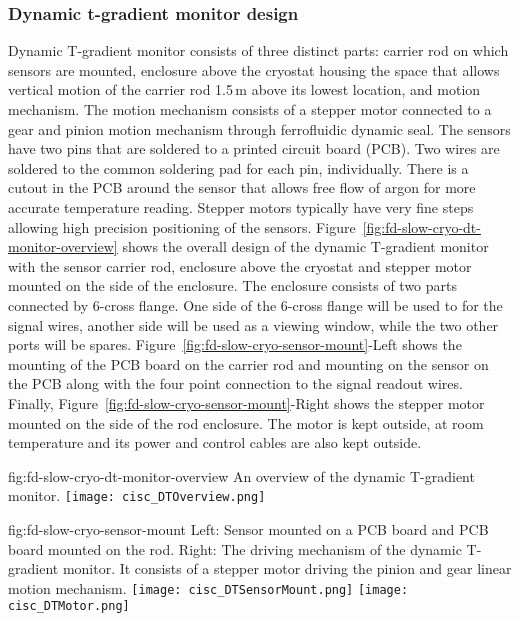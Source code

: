 \subsubsection{Dynamic t-gradient monitor design}
Dynamic T-gradient monitor consists of three distinct parts: carrier rod on which sensors are mounted, enclosure above the cryostat housing the space that allows vertical motion of the carrier rod 1.5\,m above its lowest location, and motion mechanism. The motion mechanism consists of a stepper motor connected to a gear and pinion motion mechanism through ferrofluidic dynamic seal. The sensors have two pins that are soldered to a printed circuit board (PCB). Two wires are soldered to the common soldering pad for each pin, individually.   There is a cutout in the PCB around the sensor that allows free flow of argon for more accurate temperature reading.  Stepper motors typically have very fine steps allowing high precision positioning of the sensors.  Figure~\ref{fig:fd-slow-cryo-dt-monitor-overview} shows the overall design of the dynamic T-gradient monitor with the sensor carrier rod, enclosure above the cryostat and stepper motor mounted on the side of the enclosure. The enclosure consists of two parts connected by 6-cross flange. One side of the 6-cross flange will be used to for the signal wires, another side will be used as a viewing window, while the two other ports will be spares. Figure~\ref{fig:fd-slow-cryo-sensor-mount}-Left shows the mounting of the PCB board on the carrier rod and mounting on the sensor on the PCB along with the four point connection to the signal readout wires. Finally, Figure~\ref{fig:fd-slow-cryo-sensor-mount}-Right shows the stepper motor mounted on the side of the rod enclosure. The motor is kept outside, at room temperature and its power and control cables are also kept outside.

\begin{dunefigure}{fig:fd-slow-cryo-dt-monitor-overview}
  {An overview of the dynamic T-gradient monitor.}
 \texttt{[image: cisc\_DTOverview.png]}
\end{dunefigure}
\begin{dunefigure}{fig:fd-slow-cryo-sensor-mount}
  {Left: Sensor mounted on a PCB board and PCB board mounted on the rod. Right:
    The driving mechanism of the dynamic T-gradient monitor. It consists of a stepper motor driving the pinion and gear linear motion mechanism. }
  \texttt{[image: cisc\_DTSensorMount.png]}
  \hspace{3cm}%
  \texttt{[image: cisc\_DTMotor.png]}
\end{dunefigure}

